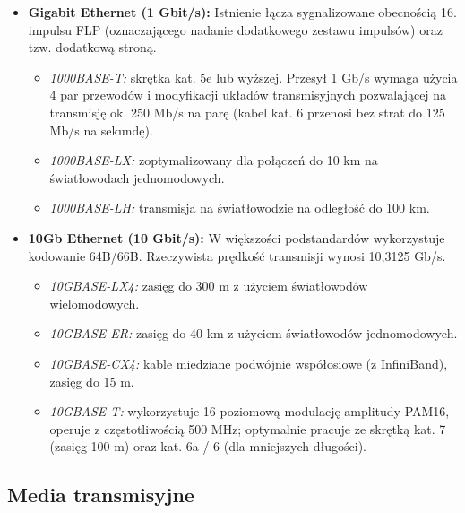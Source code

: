 \documentclass[11pt,a4paper]{article}
\begin{document}
\begin{itemize}[noitemsep]
\begin{itemize}[noitemsep]
        \item \textit{100BASE-SX:} światłowody wielomodowe, zasięg około 460/550 m.
    \end{itemize}
    \item \textbf{Gigabit Ethernet (1 Gbit/s):} Istnienie łącza sygnalizowane obecnością 16. impulsu FLP (oznaczającego nadanie dodatkowego zestawu impulsów) oraz tzw. dodatkową stroną.
    \begin{itemize}[noitemsep]
        \item \textit{1000BASE-T:} skrętka kat. 5e lub wyższej. Przesył 1 Gb/s wymaga użycia 4 par przewodów i modyfikacji układów transmisyjnych pozwalającej na transmisję ok. 250 Mb/s na parę (kabel kat. 6 przenosi bez strat do 125 Mb/s na sekundę).
        \item \textit{1000BASE-LX:} zoptymalizowany dla połączeń do 10 km na światłowodach jednomodowych.
        \item \textit{1000BASE-LH:} transmisja na światłowodzie na odległość do 100 km.
    \end{itemize}
    \item \textbf{10Gb Ethernet (10 Gbit/s):} W większości podstandardów wykorzystuje kodowanie 64B/66B. Rzeczywista prędkość transmisji wynosi 10,3125 Gb/s.
    \begin{itemize}[noitemsep]
        \item \textit{10GBASE-LX4:} zasięg do 300 m z użyciem światłowodów wielomodowych.
        \item \textit{10GBASE-ER:} zasięg do 40 km z użyciem światłowodów jednomodowych.
        \item \textit{10GBASE-CX4:} kable miedziane podwójnie współosiowe (z InfiniBand), zasięg do 15 m.
        \item \textit{10GBASE-T:} wykorzystuje 16-poziomową modulację amplitudy PAM16, operuje z częstotliwością 500 MHz; optymalnie pracuje ze skrętką kat. 7 (zasięg 100 m) oraz kat. 6a / 6 (dla mniejszych długości).
    \end{itemize}
\end{itemize}

\subsection{Media transmisyjne}
\end{document}
